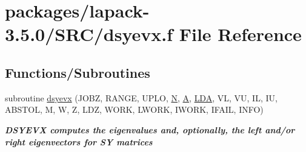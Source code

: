 \hypertarget{dsyevx_8f}{}\section{packages/lapack-\/3.5.0/\+S\+R\+C/dsyevx.f File Reference}
\label{dsyevx_8f}
\subsection*{Functions/\+Subroutines}
\begin{DoxyCompactItemize}
\item 
subroutine \hyperlink{group__doubleSYeigen_ga68612cdf4ed1051c08f0b0735b8dfdea}{dsyevx} (J\+O\+B\+Z, R\+A\+N\+G\+E, U\+P\+L\+O, \hyperlink{polmisc_8c_a0240ac851181b84ac374872dc5434ee4}{N}, \hyperlink{classA}{A}, \hyperlink{example__user_8c_ae946da542ce0db94dced19b2ecefd1aa}{L\+D\+A}, V\+L, V\+U, I\+L, I\+U, A\+B\+S\+T\+O\+L, M, W, Z, L\+D\+Z, W\+O\+R\+K, L\+W\+O\+R\+K, I\+W\+O\+R\+K, I\+F\+A\+I\+L, I\+N\+F\+O)
\begin{DoxyCompactList}\small\item\em {\bfseries  D\+S\+Y\+E\+V\+X computes the eigenvalues and, optionally, the left and/or right eigenvectors for S\+Y matrices} \end{DoxyCompactList}\end{DoxyCompactItemize}
